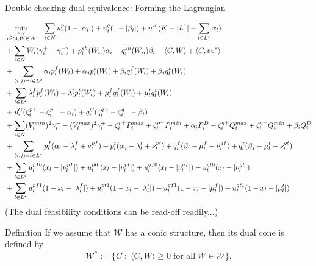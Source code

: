 \documentclass[xcolor=dvipsnames]{beamer}
\newcommand{\ii}{i}
\newcommand{\WW}{W}
\newcommand{\WSet}{\mathcal{W}}
\begin{document}
\begin{frame}{Double-checking dual equivalence: Forming the Lagrangian}
\begin{tiny}
\begin{subequations}
\begin{align}
&\min_{\substack{p,q\\ u \geqq 0,W \in \WSet}} \quad 
  \sum_{i \in N} u_i^{p}(1-|\alpha_{\ii}|) +  u_i^{q}(1-|\beta_{\ii}|)   
+ u^K(K-|L^1|-\sum_{l \in L^*} x_l) \notag \\
  &+\sum_{\ii \in N} W_\ii(\gamma_{\ii}^+-\gamma_{\ii}^-) +p_\ii^{sh}(\WW_{ii})\alpha_\ii + q_\ii^{sh}(\WW_{ii})\beta_\ii - \langle C , \WW \rangle + \langle C, v v^* \rangle \notag\\
&+\sum_{(i,j)=l \in L^0} \alpha_i p_l^f(\WW_l) + \alpha_j p_l^t(\WW_l) + \beta_i q_l^f(\WW_l) + \beta_j q_l^t(\WW_l) \notag\\
&+\sum_{l \in L^*} \lambda_l^f p_l^f(\WW_l) + \lambda_l^t p_l^t(\WW_l) + \mu_l^f q_l^f(\WW_l) + \mu_l^t q_l^t(\WW_l) \notag\\
&+ p_\ii^G(\zeta_\ii^{p+}-\zeta_\ii^{p-} - \alpha_\ii) + q_\ii^G(\zeta_\ii^{q+}-\zeta_\ii^{q-} - \beta_\ii)\notag \\
  &+\sum_{\ii \in N}  (V_\ii^{min})^2 \gamma_\ii^- - (V_\ii^{max})^2 \gamma_\ii^+ 
- \zeta_\ii^{p+}P_\ii^{max} + \zeta_\ii^{p-}P_\ii^{min} + \alpha_\ii P_\ii^D 
- \zeta_\ii^{q+}Q_\ii^{max} + \zeta_\ii^{q-}Q_\ii^{min} + \beta_\ii Q_\ii^D \notag \\
  &+ \sum_{(i,j)=l \in L^* } p_{l}^{f}(\alpha_i-\lambda_l^f+\nu_l^{pf}) + p_{l}^{t}(\alpha_j-\lambda_l^t + \nu_l^{pt}) 
                 + q_{l}^{f}(\beta_i-\mu_l^f+\nu_l^{qf}) + q_{l}^{t}(\beta_j-\mu_l^t-\nu_l^{qt})  \notag \\
  & + \sum_{l \in L^* } u_l^{pf0}(x_l-|\nu_l^{pf}|) + u_l^{pt0}(x_l-|\nu_l^{pt}|) + u_l^{qf0}(x_l-|\nu_l^{qf}|) + u_l^{qt0}(x_l - |\nu_l^{qt}|) \notag \\
& + \sum_{l \in L^* } u_l^{pf1}(1-x_l - |\lambda_l^f|) + u_l^{pt1}(1-x_l-|\lambda_l^t|) + u_l^{qf1}(1-x_l-|\mu_l^f|) + u_l^{qt1}(1-x_l-|\mu_l^t|) \notag
\end{align}
\end{subequations}
(The dual feasibility conditions can be read-off readily...)
\end{tiny}
\end{frame}

\begin{frame}{Definition}
If we assume that $\WSet$ has a conic structure, then its dual cone is defined by
$$\WSet^* := \{ C \; : \; \langle C, \WW \rangle \ge 0\; \text{for all}\; \WW \in \WSet \}.$$
\end{frame}
\end{document}

